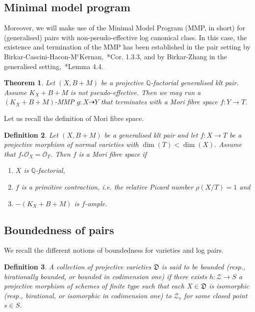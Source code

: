 \documentclass[11pt]{ip-journal}
\newtheorem{theorem}{Theorem}[section]
\newtheorem{definition}[theorem]{Definition}
\theoremstyle{definition}
\begin{document}
\subsection{Minimal model program}
Moreover, we will make use of the Minimal Model Program (MMP, in short) for (generalised) pairs with non-pseudo-effective log canonical class. 
In this case, the existence and termination of the MMP has been established in the pair setting by Birkar-Cascini-Hacon-M$^\text{c}$Kernan,~\cite{BCHM}*{Cor. 1.3.3}, and by Birkar-Zhang in the generalised setting,~\cite{bir-zh}*{Lemma 4.4}. 

\begin{theorem}
\label{mmp}
\cites{bir-zh, BCHM}
Let $(X, B+M)$ be a projective $\mathbb{Q}$-factorial generalised klt pair. 
Assume $K_{X}+B+M$ is not pseudo-effective. 
Then we may run a $(K_{X}+B+M)$-MMP $g \colon X \dashrightarrow Y$ that terminates with a Mori fibre space $f\colon Y \rightarrow T$.
\end{theorem}

Let us recall the definition of Mori fibre space. 

\begin{definition}
Let $(X, B+M)$ be a generalised klt pair and let $f \colon X\rightarrow T$ be a projective morphism of normal varieties with $\dim(T)<\dim(X)$. 
Assume that $f_\ast \mathcal{O}_X=\mathcal{O}_T$. 
Then $f$ is a Mori fibre space if 
	\begin{enumerate}
		\item $X$ is $\mathbb{Q}$-factorial,
		\item $f$ is a primitive contraction, i.e. the relative Picard number $\rho(X/T)=1$ and 
		\item $-(K_{X}+B+M)$ is $f$-ample.
	\end{enumerate}
\end{definition}


\subsection{Boundedness of pairs} 
\label{bound.sect}

We recall the different notions of boundedness for varieties and log pairs.
\begin{definition}
A collection of projective varieties $\mathfrak{D}$ is said to be \emph{bounded} (resp.,  \emph{birationally bounded}, or \emph{bounded in codimension one}) if there exists  $h\colon \mathcal{Z}\rightarrow S$ a projective morphism of schemes of finite type such that each $X\in \mathfrak{D}$ is isomorphic (resp., birational, or isomorphic in codimension one) to $\mathcal{Z}_s$ for some closed point $s\in S$.
\end{definition}
\end{document}
